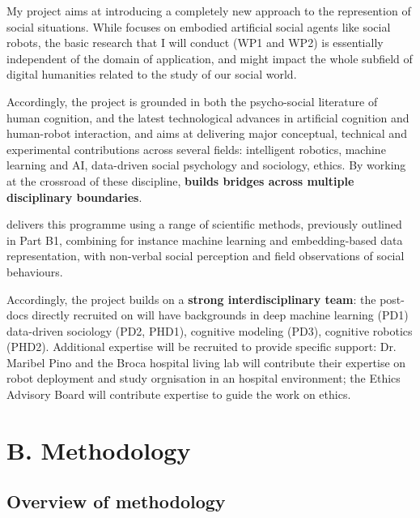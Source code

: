 My project aims at introducing a completely new approach to the represention of
social situations. While \project focuses on embodied artificial social agents
like social robots, the basic research that I will conduct (WP1 and WP2) is
essentially independent of the domain of application, and might impact the whole
subfield of digital humanities related to the study of our social world.

Accordingly, the project is grounded in both the psycho-social literature of
human cognition, and the latest technological advances in artificial cognition
and human-robot interaction, and aims at delivering major conceptual, technical
and experimental contributions across several fields: intelligent robotics,
machine learning and AI, data-driven social psychology and sociology, ethics. By
working at the crossroad of these discipline, \textbf{\project builds bridges
across multiple disciplinary boundaries}.

\project delivers this programme using a range of scientific methods,
previously outlined in Part B1, combining for instance machine learning and
embedding-based data representation, with non-verbal social perception and field
observations of social behaviours.

Accordingly, the project builds on a \textbf{strong interdisciplinary team}: the
post-docs directly recruited on \project will have backgrounds in deep machine
learning (PD1) data-driven sociology (PD2, PHD1), cognitive modeling (PD3),
cognitive robotics (PHD2). Additional expertise will be recruited to provide
specific support: Dr. Maribel Pino and the Broca hospital living lab will
contribute their expertise on robot deployment and study orgnisation in an
hospital environment; the \project Ethics Advisory Board will contribute
expertise to guide the work on ethics.

\newpage
\section{B. Methodology}

\subsection{Overview of \project methodology}

